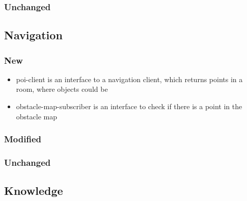 \documentclass[main.tex]{subfiles}
\begin{document}
                \subsubsection{Unchanged}
                \subsection{Navigation}
                \subsubsection{New}
                 \begin{itemize}
 				 \item poi-client is an interface to a navigation client, which returns points in a room, where objects could be 
  				 \item obstacle-map-subscriber is an interface to check if there is a point in the obstacle map
				\end{itemize}  
                \subsubsection{Modified}
                \subsubsection{Unchanged}
                \subsection{Knowledge}
\end{document}
